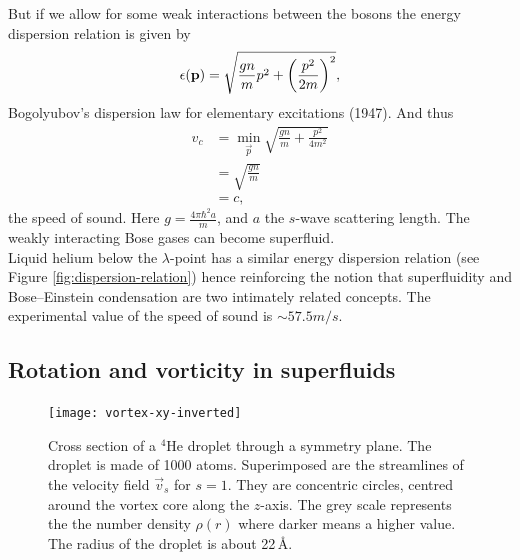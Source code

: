 			But if we allow for some weak interactions between the bosons the energy dispersion relation is given by
			\begin{align}
				\epsilon(\bm{\mathrm{p}})=\sqrt{\frac{gn}{m}p^2+\qty(\frac{p^2}{2m})^2},
			\end{align}
			Bogolyubov's dispersion law for elementary excitations (1947). And thus
			\begin{align}
				v_c &=\min_{\vec{p}}\sqrt{\frac{gn}{m}+\frac{p^2}{4m^2}} \\
					&= \sqrt{\frac{gn}{m}} \\
					&= c,
			\end{align}
			the speed of sound. Here $g=\frac{4\pi\hbar^2a}{m}$, and $a$ the $s$-wave scattering length. The weakly interacting Bose gases can become superfluid.\\			

			Liquid helium below the $\lambda$-point has a similar energy dispersion relation (see Figure \ref{fig:dispersion-relation}) hence reinforcing the notion that superfluidity and Bose--Einstein condensation are two intimately related concepts. The experimental value of the speed of sound is $\sim\!57.5\unit{m/s}$.
			
		\subsection{Rotation and vorticity in superfluids}\label{sec:rot-vort}
			\begin{figure}[t]
				\begin{center}
					\texttt{[image: vortex-xy-inverted]}
					\caption{Cross section of a $^4$He droplet through a symmetry plane. The droplet is made of 1000 atoms. Superimposed are the streamlines of the velocity field $\vec{v}_s$ for $s=1$. They are concentric circles, centred around the vortex core along the $z$-axis. The grey scale represents the the number density $\rho(r)$ where darker means a higher value. The radius of the droplet is about 22\,\AA.}
					\label{fig:vortex-xy}
				\end{center}
			\end{figure}
		
